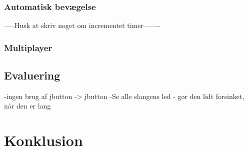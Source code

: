 \documentclass{report}
\begin{document}
\subsection{Automatisk bevægelse}
-----Husk at skriv noget om incrementet timer-------

\subsection{Multiplayer}

\section{Evaluering}
-ingen brug af jbutton -> jbutton
-Se alle slangens led - gør den lidt forsinket, når den er lang



\chapter{Konklusion}
\end{document}
